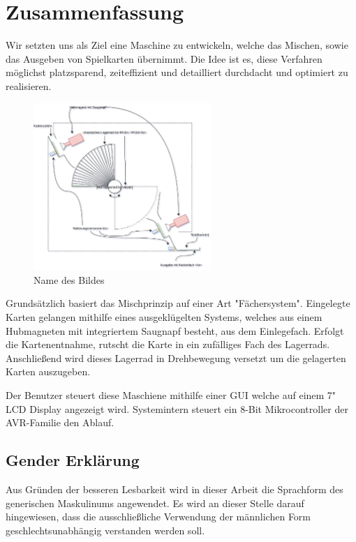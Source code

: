 \section*{Zusammenfassung}
Wir setzten uns als Ziel eine Maschine zu entwickeln, welche das Mischen, sowie das Ausgeben von Spielkarten übernimmt.
Die Idee ist es, diese Verfahren möglichst platzsparend, zeiteffizient und detailliert durchdacht und optimiert zu realisieren.\\


\begin{figure}[H]
  \centering
  \includegraphics[width=0.6\textwidth]{fig/Reshuffled_Version_3_0_prinzip.pdf}
  \caption{Name des Bildes}
  \label{fig:verweis}
\end{figure}

Grundsätzlich basiert das Mischprinzip auf einer Art "Fächersystem".
Eingelegte Karten gelangen mithilfe eines ausgeklügelten Systems, welches aus einem Hubmagneten mit integriertem Saugnapf besteht, aus dem Einlegefach.
Erfolgt die Kartenentnahme, rutscht die Karte in ein zufälliges Fach des Lagerrads. Anschließend wird dieses Lagerrad in Drehbewegung versetzt um die gelagerten Karten auszugeben.

Der Benutzer steuert diese Maschiene mithilfe einer GUI welche auf einem 7" LCD Display angezeigt wird. Systemintern steuert ein 8-Bit Mikrocontroller der AVR-Familie den Ablauf.

\clearpage

\newpage
\thispagestyle{empty}
\mbox{}

\clearpage

\subsection*{Gender Erklärung}
\label{sec:gender-erklaerung}
Aus Gründen der besseren Lesbarkeit wird in dieser Arbeit die Sprachform des generischen Maskulinums angewendet. Es wird an dieser Stelle darauf hingewiesen, dass die ausschließliche Verwendung der männlichen Form geschlechtsunabhängig verstanden werden soll.

